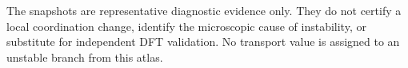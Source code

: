 The snapshots are representative diagnostic evidence only. They do not certify a local coordination change, identify the microscopic cause of instability, or substitute for independent DFT validation. No transport value is assigned to an unstable branch from this atlas.
